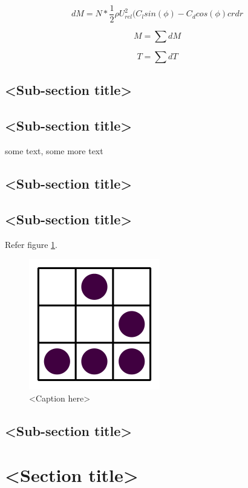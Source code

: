 \begin{equation}\label{key}
dM = N*\frac{1}{2}\rho U^2_{rel}(C_l sin(\phi)-C_d cos(\phi)c r dr
\end{equation}

\begin{equation}\label{key}
M = \sum dM
\end{equation}

\begin{equation}\label{key}
T = \sum dT
\end{equation}

\subsection{<Sub-section title>}

\subsection{<Sub-section title>}
some text\cite{citation-2-name-here}, some more text
\subsection{<Sub-section title>}

\subsection{<Sub-section title>}

Refer figure \ref{fig:label}.

\begin{figure}[htb]
\centering
\includegraphics[scale=0.3]{./glider} %
\caption{<Caption here>}
\label{fig:label} %
\end{figure}

\subsection{<Sub-section title>}


\section{<Section title>}

